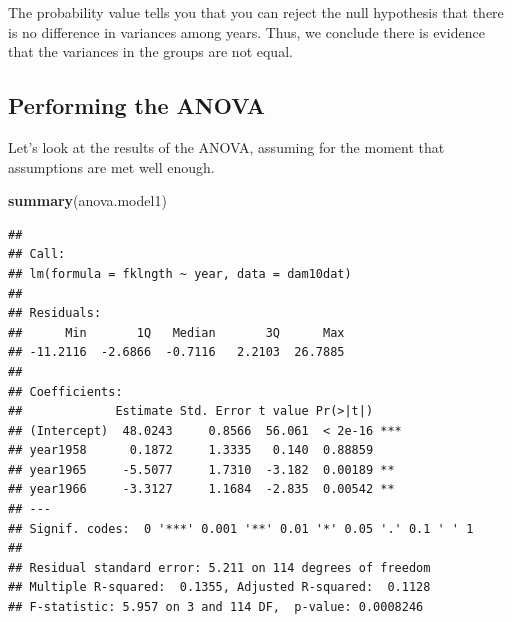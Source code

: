 \documentclass[
  12pt,
]{book}
\newenvironment{Shaded}{\begin{snugshade}}{\end{snugshade}}
\newcommand{\KeywordTok}[1]{\textcolor[rgb]{0.13,0.29,0.53}{\textbf{#1}}}
\newcommand{\NormalTok}[1]{#1}
\begin{document}
The probability value tells you that you can reject the null hypothesis that there is no difference in variances among years. Thus, we conclude there is evidence that the variances in the groups are not equal.

\hypertarget{performing-the-anova}{%
\subsection{Performing the ANOVA}\label{performing-the-anova}}

Let's look at the results of the ANOVA, assuming for the moment that assumptions are met well enough.

\begin{Shaded}
\begin{Highlighting}[]
\KeywordTok{summary}\NormalTok{(anova.model1)}
\end{Highlighting}
\end{Shaded}

\begin{verbatim}
## 
## Call:
## lm(formula = fklngth ~ year, data = dam10dat)
## 
## Residuals:
##      Min       1Q   Median       3Q      Max 
## -11.2116  -2.6866  -0.7116   2.2103  26.7885 
## 
## Coefficients:
##             Estimate Std. Error t value Pr(>|t|)    
## (Intercept)  48.0243     0.8566  56.061  < 2e-16 ***
## year1958      0.1872     1.3335   0.140  0.88859    
## year1965     -5.5077     1.7310  -3.182  0.00189 ** 
## year1966     -3.3127     1.1684  -2.835  0.00542 ** 
## ---
## Signif. codes:  0 '***' 0.001 '**' 0.01 '*' 0.05 '.' 0.1 ' ' 1
## 
## Residual standard error: 5.211 on 114 degrees of freedom
## Multiple R-squared:  0.1355, Adjusted R-squared:  0.1128 
## F-statistic: 5.957 on 3 and 114 DF,  p-value: 0.0008246
\end{verbatim}
\end{document}
